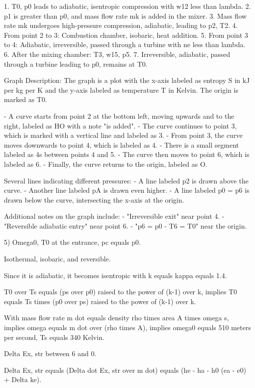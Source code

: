 1. T0, p0 leads to adiabatic, isentropic compression with w12 less than lambda.
2. p1 is greater than p0, and mass flow rate mk is added in the mixer.
3. Mass flow rate mk undergoes high-pressure compression, adiabatic, leading to p2, T2.
4. From point 2 to 3: Combustion chamber, isobaric, heat addition.
5. From point 3 to 4: Adiabatic, irreversible, passed through a turbine with ne less than lambda.
6. After the mixing chamber: T3, w15, p5.
7. Irreversible, adiabatic, passed through a turbine leading to p0, remains at T0.

Graph Description:
The graph is a plot with the x-axis labeled as entropy S in kJ per kg per K and the y-axis labeled as temperature T in Kelvin. The origin is marked as T0.

- A curve starts from point 2 at the bottom left, moving upwards and to the right, labeled as HO with a note "is added".
- The curve continues to point 3, which is marked with a vertical line and labeled as 3.
- From point 3, the curve moves downwards to point 4, which is labeled as 4.
- There is a small segment labeled as 4s between points 4 and 5.
- The curve then moves to point 6, which is labeled as 6.
- Finally, the curve returns to the origin, labeled as O.

Several lines indicating different pressures:
- A line labeled p2 is drawn above the curve.
- Another line labeled pA is drawn even higher.
- A line labeled p0 = p6 is drawn below the curve, intersecting the x-axis at the origin.

Additional notes on the graph include:
- "Irreversible exit" near point 4.
- "Reversible adiabatic entry" near point 6.
- "p6 = p0 - T6 = T0" near the origin.

5) Omega0, T0 at the entrance, pc equals p0.

Isothermal, isobaric, and reversible.

Since it is adiabatic, it becomes isentropic with k equals kappa equals 1.4.

T0 over Ts equals (ps over p0) raised to the power of (k-1) over k, implies T0 equals Ts times (p0 over ps) raised to the power of (k-1) over k.

With mass flow rate m dot equals density rho times area A times omega s, implies omega equals m dot over (rho times A), implies omega0 equals 510 meters per second, Ts equals 340 Kelvin.

Delta Ex, str between 6 and 0.

Delta Ex, str equals (Delta dot Ex, str over m dot) equals (he - ha - h0 (ea - e0) + Delta ke).


